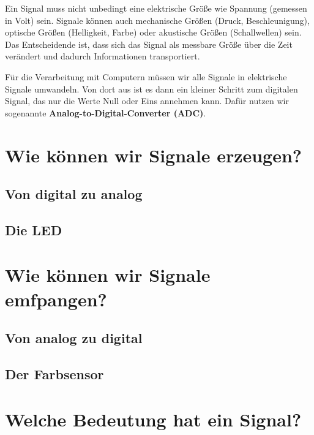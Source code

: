 \documentclass[
  letterpaper,
  DIV=11]{scrreprt}
\begin{document}
Ein Signal muss nicht unbedingt eine elektrische Größe wie Spannung
(gemessen in Volt) sein. Signale können auch mechanische Größen (Druck,
Beschleunigung), optische Größen (Helligkeit, Farbe) oder akustische
Größen (Schallwellen) sein. Das Entscheidende ist, dass sich das Signal
als messbare Größe über die Zeit verändert und dadurch Informationen
transportiert.

Für die Verarbeitung mit Computern müssen wir alle Signale in
elektrische Signale umwandeln. Von dort aus ist es dann ein kleiner
Schritt zum digitalen Signal, das nur die Werte Null oder Eins annehmen
kann. Dafür nutzen wir sogenannte \textbf{Analog-to-Digital-Converter
(ADC)}.

\section{Wie können wir Signale
erzeugen?}\label{wie-kuxf6nnen-wir-signale-erzeugen}

\subsection{Von digital zu analog}\label{von-digital-zu-analog}

\subsection{Die LED}\label{die-led}

\section{Wie können wir Signale
emfpangen?}\label{wie-kuxf6nnen-wir-signale-emfpangen}

\subsection{Von analog zu digital}\label{von-analog-zu-digital}

\subsection{Der Farbsensor}\label{der-farbsensor}

\section{Welche Bedeutung hat ein
Signal?}\label{welche-bedeutung-hat-ein-signal}
\end{document}
